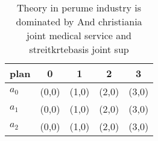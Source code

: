 \documentclass[a4paper]{article}
\begin{document}
\begin{table}
\begin{adjustbox}{width=0.9\columnwidth}
\begin{tabular}{|l|l|l|l|l|}
\hline
\textbf{plan} & \multicolumn{1}{c|}{\textbf{0}} & \multicolumn{1}{c|}{\textbf{1}} & \multicolumn{1}{c|}{\textbf{2}} & \multicolumn{1}{c|}{\textbf{3}} \\ \hline
\textbf{$a_0$}  & (0,0) & (1,0) & (2,0) & (3,0) \\ \hline
\textbf{$a_1$}  & (0,0) & (1,0) & (2,0) & (3,0) \\ \hline
\textbf{$a_2$}  & (0,0) & (1,0) & (2,0) & (3,0) \\ \hline
\end{tabular}
\end{adjustbox}
\caption{Theory in perume industry is dominated by And christiania joint medical service and streitkrtebasis joint sup
}
\end{table}
\end{document}
